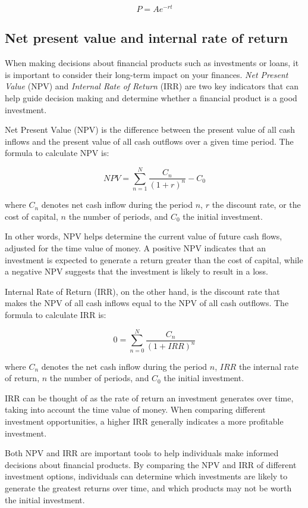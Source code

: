 \documentclass[
  12pt,
  oneside]{book}
\theoremstyle{definition}
\theoremstyle{definition}
\theoremstyle{definition}
\theoremstyle{definition}
\theoremstyle{remark}
\begin{document}
\[
P=Ae^{-rt}
\]

\subsection{Net present value and internal rate of return}\label{net-present-value-and-internal-rate-of-return}

When making decisions about financial products such as investments or loans, it is important to consider their long-term impact on your finances. \emph{Net Present Value} (NPV) and \emph{Internal Rate of Return} (IRR) are two key indicators that can help guide decision making and determine whether a financial product is a good investment.

Net Present Value (NPV) is the difference between the present value of all cash inflows and the present value of all cash outflows over a given time period. The formula to calculate NPV is:

\[ NPV = \sum_{n=1}^{N} \frac{C_n}{(1+r)^n} - C_0 \]

where \(C_n\) denotes net cash inflow during the period \(n\), \(r\) the discount rate, or the cost of capital, \(n\) the number of periods, and \(C_0\) the initial investment.

In other words, NPV helps determine the current value of future cash flows, adjusted for the time value of money. A positive NPV indicates that an investment is expected to generate a return greater than the cost of capital, while a negative NPV suggests that the investment is likely to result in a loss.

Internal Rate of Return (IRR), on the other hand, is the discount rate that makes the NPV of all cash inflows equal to the NPV of all cash outflows. The formula to calculate IRR is:

\[ 0 = \sum_{n=0}^{N} \frac{C_n}{(1+IRR)^n}  \]

where \(C_n\) denotes the net cash inflow during the period \(n\), \(IRR\) the internal rate of return, \(n\) the number of periods, and \(C_0\) the initial investment.

IRR can be thought of as the rate of return an investment generates over time, taking into account the time value of money. When comparing different investment opportunities, a higher IRR generally indicates a more profitable investment.

Both NPV and IRR are important tools to help individuals make informed decisions about financial products. By comparing the NPV and IRR of different investment options, individuals can determine which investments are likely to generate the greatest returns over time, and which products may not be worth the initial investment.
\end{document}
